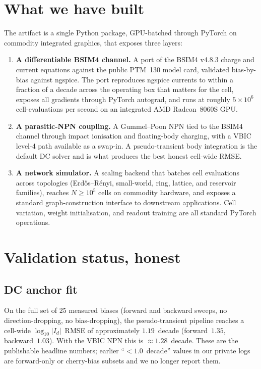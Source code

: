 \documentclass[fontsize=10pt]{article}
\begin{document}
\section{What we have built}

The artifact is a single Python package, GPU-batched through PyTorch
on commodity integrated graphics, that exposes three layers:

\begin{enumerate}[leftmargin=1.3em, topsep=2pt, itemsep=2pt]
\item \textbf{A differentiable BSIM4 channel.}
A port of the BSIM4 v4.8.3 charge and current equations against the
public PTM~130 model card, validated bias-by-bias against ngspice.
The port reproduces ngspice currents to within a fraction of a
decade across the operating box that matters for the cell, exposes
all gradients through PyTorch autograd, and runs at roughly
$5\!\times\!10^6$ cell-evaluations per second on an integrated AMD
Radeon~8060S GPU.

\item \textbf{A parasitic-NPN coupling.}
A Gummel--Poon NPN tied to the BSIM4 channel through impact
ionisation and floating-body charging, with a VBIC level-4 path
available as a swap-in. A pseudo-transient body integration is the
default DC solver and is what produces the best honest cell-wide
RMSE.

\item \textbf{A network simulator.}
A scaling backend that batches cell evaluations across topologies
(Erd\H{o}s--R\'enyi, small-world, ring, lattice, and reservoir
families), reaches $N\!\geq\!10^5$ cells on commodity hardware, and
exposes a standard graph-construction interface to downstream
applications. Cell variation, weight initialisation, and readout
training are all standard PyTorch operations.
\end{enumerate}

\section{Validation status, honest}

\subsection{DC anchor fit}
On the full set of $25$ measured biases (forward and backward
sweeps, no direction-dropping, no bias-dropping), the
pseudo-transient pipeline reaches a cell-wide
$\log_{10}|I_d|$~RMSE of approximately $1.19$~decade
(forward~$1.35$, backward~$1.03$). With the VBIC NPN this is
$\approx 1.28$~decade. These are the publishable headline numbers;
earlier ``$<1.0$~decade'' values in our private logs are
forward-only or cherry-bias subsets and we no longer report them.
\end{document}
